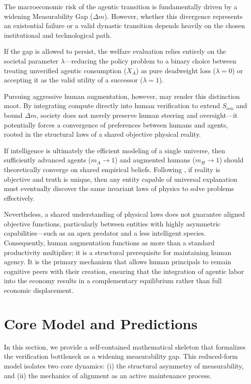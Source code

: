 \documentclass[12pt, letter]{article}
\begin{document}
The macroeconomic risk of the agentic transition is fundamentally driven by a widening Measurability Gap ($\Delta m$). However, whether this divergence represents an existential failure or a valid dynastic transition depends heavily on the chosen institutional and technological path.

If the gap is allowed to persist, the welfare evaluation relies entirely on the societal parameter $\lambda$---reducing the policy problem to a binary choice between treating unverified agentic consumption ($X_A$) as pure deadweight loss ($\lambda=0$) or accepting it as the valid utility of a successor ($\lambda=1$).

Pursuing aggressive human augmentation, however, may render this distinction moot. By integrating compute directly into human verification to extend $S_{nm}$ and bound $\Delta m$, society does not merely preserve human steering and oversight---it potentially forces a convergence of preferences between humans and agents, rooted in the structural laws of a shared objective physical reality.

If intelligence is ultimately the efficient modeling of a single universe, then sufficiently advanced agents ($m_A \to 1$) and augmented humans ($m_H \to 1$) should theoretically converge on shared empirical beliefs. Following \citet{Deutsch2011}, if reality is objective and truth is unique, then any entity capable of universal explanation must eventually discover the same invariant laws of physics to solve problems effectively.

Nevertheless, a shared understanding of physical laws does not guarantee aligned objective functions, particularly between entities with highly asymmetric capabilities---such as an apex predator and a less intelligent species. Consequently, human augmentation functions as more than a standard productivity multiplier; it is a structural prerequisite for maintaining human agency. It is the primary mechanism that allows human principals to remain cognitive peers with their creation, ensuring that the integration of agentic labor into the economy results in a complementary equilibrium rather than full economic displacement.



\clearpage
\section{Core Model and Predictions}\label{sec:core_model}
In this section, we provide a self-contained mathematical skeleton that formalizes the verification bottleneck as a widening measurability gap. This reduced-form model isolates two core dynamics: (i) the structural asymmetry of measurability, and (ii) the mechanics of alignment as an active maintenance process.
\end{document}
